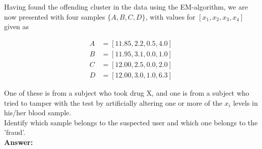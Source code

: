 \documentclass[a4paper]{article}
\begin{document}
Having found the offending cluster in the data using the EM-algorithm, we are now presented with four samples $\{ A, B, C, D\}$, with values for $[x_1, x_2, x_3, x_4]$ given as 

\begin{align*}
A &= [11.85, 2.2, 0.5, 4.0]\\
B &= [11.95, 3.1, 0.0, 1.0]\\
C &= [12.00, 2.5, 0.0, 2.0]\\
D &= [12.00, 3.0, 1.0, 6.3]
\end{align*}

One of these is from a subject who took drug X, and one is from a subject who tried to tamper with the test by artificially altering one or more of the $x_i$ levels in his/her blood sample.\\

Identify which sample belongs to the suspected user and which one belongs to the 'fraud'.\\

\textbf{Answer:}\\
\end{document}
